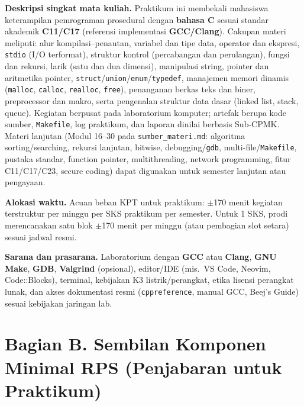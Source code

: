 \documentclass[12pt,a4paper]{article}
\begin{document}
\vspace{0.5cm}

\noindent\textbf{Deskripsi singkat mata kuliah.} Praktikum ini membekali mahasiswa keterampilan pemrograman prosedural dengan \textbf{bahasa C} sesuai standar akademik \textbf{C11/C17} (referensi implementasi \textbf{GCC/Clang}). Cakupan materi meliputi: alur kompilasi--penautan, variabel dan tipe data, operator dan ekspresi, \texttt{stdio} (I/O terformat), struktur kontrol (percabangan dan perulangan), fungsi dan rekursi, larik (satu dan dua dimensi), manipulasi string, pointer dan aritmetika pointer, \texttt{struct}/\texttt{union}/\texttt{enum}/\texttt{typedef}, manajemen memori dinamis (\texttt{malloc}, \texttt{calloc}, \texttt{realloc}, \texttt{free}), penanganan berkas teks dan biner, preprocessor dan makro, serta pengenalan struktur data dasar (linked list, stack, queue). Kegiatan berpusat pada laboratorium komputer; artefak berupa kode sumber, \texttt{Makefile}, log praktikum, dan laporan dinilai berbasis Sub-CPMK. Materi lanjutan (Modul 16--30 pada \texttt{sumber\_materi.md}: algoritma sorting/searching, rekursi lanjutan, bitwise, debugging/\texttt{gdb}, multi-file/\texttt{Makefile}, pustaka standar, function pointer, multithreading, network programming, fitur C11/C17/C23, secure coding) dapat digunakan untuk semester lanjutan atau pengayaan.

\noindent\textbf{Alokasi waktu.} Acuan beban KPT untuk praktikum: $\pm$170 menit kegiatan terstruktur per minggu per SKS praktikum per semester. Untuk 1 SKS, prodi merencanakan satu blok $\pm$170 menit per minggu (atau pembagian slot setara) sesuai jadwal resmi.

\noindent\textbf{Sarana dan prasarana.} Laboratorium dengan \textbf{GCC} atau \textbf{Clang}, \textbf{GNU Make}, \textbf{GDB}, \textbf{Valgrind} (opsional), editor/IDE (mis.\ VS Code, Neovim, Code::Blocks), terminal, kebijakan K3 listrik/perangkat, etika lisensi perangkat lunak, dan akses dokumentasi resmi (\texttt{cppreference}, manual GCC, Beej's Guide) sesuai kebijakan jaringan lab.

\vspace{0.75cm}

\section*{Bagian B. Sembilan Komponen Minimal RPS (Penjabaran untuk Praktikum)}
\end{document}
